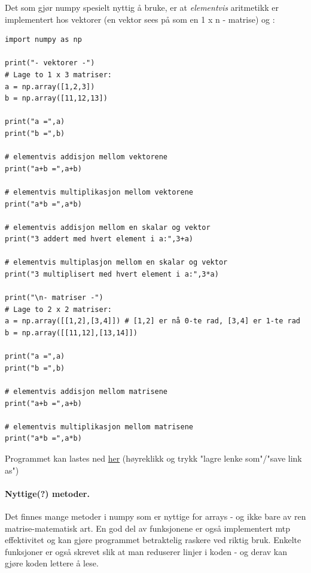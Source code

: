\documentclass[%
oneside,                 %
final,                   %
10pt]{article}
\begin{document}
Det som gjør numpy spesielt nyttig å bruke, er at \emph{elementvis} aritmetikk er implementert hos vektorer (en vektor sees på som en 1 x n - matrise) og :
\begin{verbatim}
import numpy as np

print("- vektorer -")
# Lage to 1 x 3 matriser:
a = np.array([1,2,3])
b = np.array([11,12,13])

print("a =",a)
print("b =",b)

# elementvis addisjon mellom vektorene
print("a+b =",a+b)

# elementvis multiplikasjon mellom vektorene
print("a*b =",a*b)

# elementvis addisjon mellom en skalar og vektor
print("3 addert med hvert element i a:",3+a)

# elementvis multiplasjon mellom en skalar og vektor
print("3 multiplisert med hvert element i a:",3*a)

print("\n- matriser -")
# Lage to 2 x 2 matriser:
a = np.array([[1,2],[3,4]]) # [1,2] er nå 0-te rad, [3,4] er 1-te rad
b = np.array([[11,12],[13,14]])

print("a =",a)
print("b =",b)

# elementvis addisjon mellom matrisene
print("a+b =",a+b)

# elementvis multiplikasjon mellom matrisene
print("a*b =",a*b)
\end{verbatim}
Programmet kan lastes ned \href{{https://github.com/krisbhei/INF2310/raw/master/Programmering/Python/aritmetikk_numpy.py}}{her} (høyreklikk og trykk "lagre lenke som"/"save link as")


\paragraph{Nyttige(?) metoder.}
Det finnes mange metoder i numpy som er nyttige for arrays - og ikke bare av ren matrise-matematisk art.
En god del av funksjonene er også implementert mtp effektivitet og kan gjøre programmet betraktelig raskere ved riktig bruk.
Enkelte funksjoner er også skrevet slik at man reduserer linjer i koden - og derav kan gjøre koden lettere å lese.



\vspace{3mm}
\end{document}
